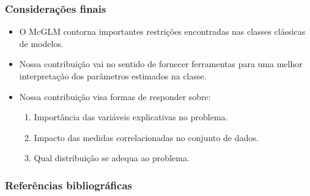 \documentclass[10pt,
  aspectratio=169,
  serif,
  mathserif,
  professionalfont,
  compress,
  handout,
  ]{beamer}\usepackage[]{graphicx}\usepackage[]{color}
\begin{document}
\begin{frame}
  \frametitle{Considerações finais}
  
\begin{itemize}
\itemsep 2ex
  \item O McGLM contorna importantes restrições encontradas nas classes clássicas de modelos.

    \item Nossa contribuição vai no sentido de fornecer ferramentas para uma melhor interpretação dos parâmetros estimados na classe.
    
    \item Nossa contribuição visa formas de responder sobre:
    
    \begin{enumerate}
      \item Importância das variáveis explicativas no problema.
      \item Impacto das medidas correlacionadas no conjunto de dados.
      \item Qual distribuição se adequa ao problema.
    \end{enumerate}

\end{itemize}

\end{frame}


\begin{frame}[c, allowframebreaks]
  \frametitle{Referências bibliográficas}
  
  \begin{tiny}
    
  \end{tiny}
  
\end{frame}
\end{document}
